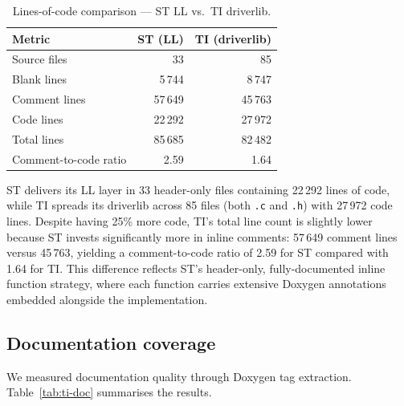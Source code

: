 \begin{table}[H]
\centering
\caption{Lines-of-code comparison --- ST LL vs.\ TI driverlib.}
\label{tab:ti-loc}
\begin{tabular}{l r r}
\toprule
\textbf{Metric} & \textbf{ST (LL)} & \textbf{TI (driverlib)} \\
\midrule
Source files      &        33 &        85 \\
Blank lines       &     5\,744 &     8\,747 \\
Comment lines     &    57\,649 &    45\,763 \\
Code lines        &    22\,292 &    27\,972 \\
\midrule
Total lines       &    85\,685 &    82\,482 \\
Comment-to-code ratio & 2.59 & 1.64 \\
\bottomrule
\end{tabular}
\end{table}

ST delivers its LL layer in 33 header-only files containing 22\,292 lines of code, while
TI spreads its driverlib across 85 files (both \texttt{.c} and \texttt{.h}) with
27\,972 code lines. Despite having 25\% more code, TI's total line count is slightly
lower because ST invests significantly more in inline comments: 57\,649 comment lines
versus 45\,763, yielding a comment-to-code ratio of 2.59 for ST compared with 1.64 for TI.
This difference reflects ST's header-only, fully-documented inline function strategy, where
each function carries extensive Doxygen annotations embedded alongside the implementation.

\subsection{Documentation coverage}
\label{subsec:ti-doc}

We measured documentation quality through Doxygen tag extraction.
Table~\ref{tab:ti-doc} summarises the results.

